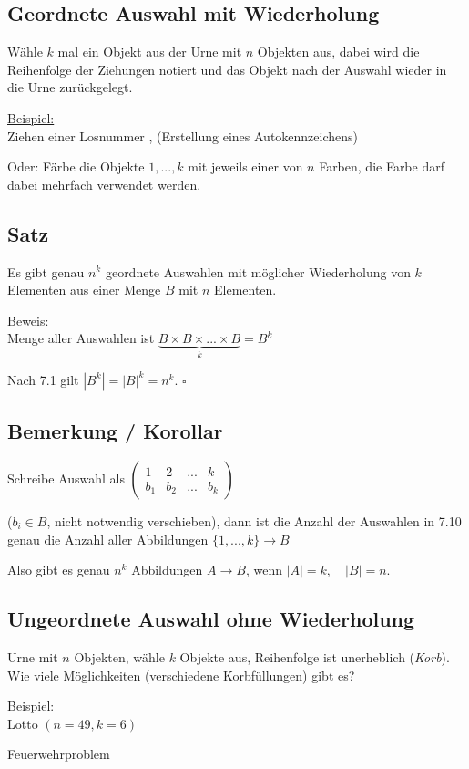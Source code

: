 \documentclass[a4paper, 12pt, twoside] {article}
\begin{document}
\subsection{Geordnete Auswahl mit Wiederholung} %


Wähle $k$ mal ein Objekt aus der Urne mit $n$ Objekten aus, dabei wird die Reihenfolge der Ziehungen notiert und das Objekt nach der Auswahl wieder in die Urne zurückgelegt.

\uline{Beispiel:} \\
Ziehen einer Losnummer , (Erstellung eines Autokennzeichens)

Oder: Färbe die Objekte $1, ... ,k$ mit jeweils einer von $n$ Farben, die Farbe darf dabei mehrfach verwendet werden.

\subsection{Satz} %
Es gibt genau $n^k$ geordnete Auswahlen mit möglicher Wiederholung von $k$ Elementen aus einer Menge $B$ mit $n$ Elementen.

\uline{Beweis:} \\
Menge aller Auswahlen ist $\underbrace{B \times B \times ... \times B}_{k} = B^k$

Nach 7.1 gilt $|B^k| = |B|^k = n^k$. \hfill $\square$

\subsection{Bemerkung / Korollar} %

Schreibe Auswahl als \quad
$
\begin{pmatrix}
1 & 2 & ... & k \\
b_1 & b_2 & ... & b_k
\end{pmatrix}
$

($b_i \in B$, nicht notwendig verschieben), dann ist die Anzahl der Auswahlen in 7.10 genau die Anzahl \uline{aller} Abbildungen $\{1, ... ,k\} \rightarrow B$

Also gibt es genau $n^k$ Abbildungen $A \rightarrow B$, wenn $|A| = k, \quad |B| = n$.

\subsection{Ungeordnete Auswahl ohne Wiederholung} %

Urne mit $n$ Objekten, wähle $k$ Objekte aus, Reihenfolge ist unerheblich (\textit{Korb}). Wie viele Möglichkeiten (verschiedene Korbfüllungen) gibt es?

\uline{Beispiel:} \\
Lotto $(n = 49, k = 6)$

Feuerwehrproblem
\end{document}
